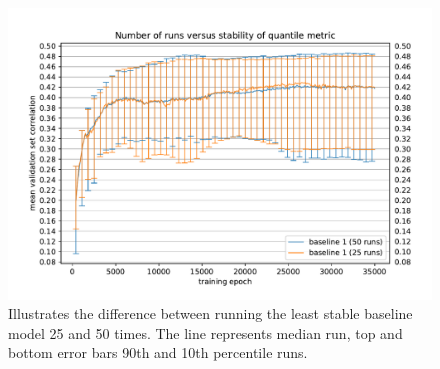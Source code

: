 \begin{figure}[H]
    \centering
    \includegraphics[width=1\textwidth]{../figures/04_runs_number}
    \caption[Impact of 25 vs 50 runs]{Illustrates the difference between running the least stable baseline model 25 and 50 times. The line represents median run, top and bottom error bars 90th and 10th percentile runs.}
    \label{fig:4.2}
\end{figure}
